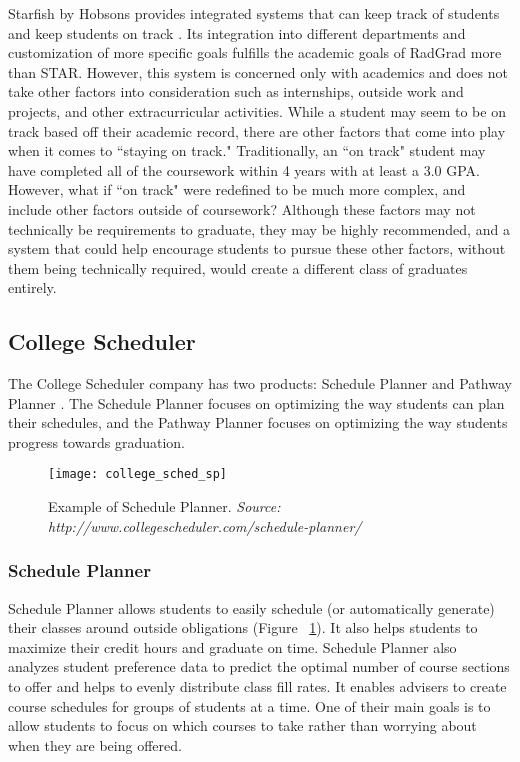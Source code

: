 Starfish by Hobsons provides integrated systems that can keep track of students and keep students on track \cite{Starfish}. Its integration into different departments and customization of more specific goals fulfills the academic goals of RadGrad more than STAR. However, this system is concerned only with academics and does not take other factors into consideration such as internships, outside work and projects, and other extracurricular activities. While a student may seem to be on track based off their academic record, there are other factors that come into play when it comes to ``staying on track." Traditionally, an ``on track" student may have completed all of the coursework within 4 years with at least a 3.0 GPA. However, what if ``on track" were redefined to be much more complex, and include other factors outside of coursework? Although these factors may not technically be requirements to graduate, they may be highly recommended, and a system that could help encourage students to pursue these other factors, without them being technically required, would create a different class of graduates entirely. 

\subsection{College Scheduler}

The College Scheduler company has two products: Schedule Planner and Pathway Planner  \cite{CollegeScheduler}. The Schedule Planner focuses on optimizing the way students can plan their schedules, and the Pathway Planner focuses on optimizing the way students progress towards graduation.

\begin{figure}[h]
\centering
\texttt{[image: college\_sched\_sp]}
\caption{Example of Schedule Planner. \textit{Source: http://www.collegescheduler.com/schedule-planner/}}
\label{college-sched}
\end{figure}

\subsubsection{Schedule Planner}

Schedule Planner allows students to easily schedule (or automatically generate) their classes around outside obligations (Figure ~\ref{college-sched}). It also helps students to maximize their credit hours and graduate on time. Schedule Planner also analyzes student preference data to predict the optimal number of course sections to offer and helps to evenly distribute class fill rates. It enables advisers to create course schedules for groups of students at a time. One of their main goals is to allow students to focus on which courses to take rather than worrying about when they are being offered.

